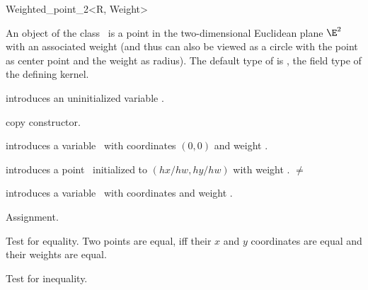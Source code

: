 \begin{ccRefClass} {Weighted_point_2<R, Weight>}

\ccDefinition
An object of the class \ccRefName\ is a point in the two-dimensional
Euclidean plane $\E^2$ with an associated weight (and thus can also
be viewed as a circle with the point as center point and the weight
as radius).  The default type of  is , the
field type of the defining kernel.

\ccInheritsFrom
{}

\ccTypes


\ccCreation
{}

\ccHidden {}
             {introduces an uninitialized variable \ccVar.}

\ccHidden {}
 	    {copy constructor.}

            {introduces a variable \ccVar\ with  
             coordinates $(0,0)$ and weight .}

            {introduces a point \ccVar\ initialized to $(hx/hw,hy/hw)$ with 
             weight .
	     \ccPrecond {} $\neq$  }

            {introduces a variable \ccVar\ with  
             coordinates  and weight .}


\ccOperations

\ccHidden 
{}
        {Assignment.}

       {Test for equality. Two points are equal, iff their $x$ and $y$ 
        coordinates are equal and their weights are equal.}

       {Test for inequality.}


\end{ccRefClass}
